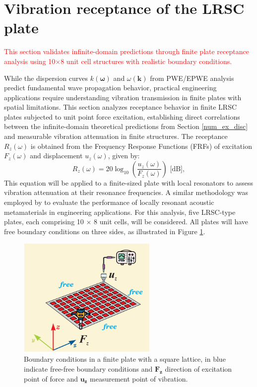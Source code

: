 \documentclass[review,numbers,sort&compress]{elsarticle}
\begin{document}
{%
\section{Vibration receptance of the LRSC plate}\label{simul_trans}
\textcolor{red}{This section validates infinite-domain predictions through finite plate receptance analysis using 10×8 unit cell structures with realistic boundary conditions.}

While the dispersion curves $k(\boldsymbol{\omega})$ and $\omega(\boldsymbol{k})$ from PWE/EPWE analysis predict fundamental wave propagation behavior, practical engineering applications require understanding vibration transmission in finite plates with spatial limitations. This section analyzes receptance behavior in finite LRSC plates subjected to unit point force excitation, establishing direct correlations between the infinite-domain theoretical predictions from Section \ref{num_ex_disc} and measurable vibration attenuation in finite structures. The receptance  $R_z(\omega)$  is obtained from the Frequency Response Functions (FRFs) of excitation $F_z(\omega)$ and displacement $u_z(\omega)$, given by:
\begin{equation}
	R_z(\omega) = 20 \log_{10} \left( \frac{u_z(\omega)}{F_z(\omega)} \right) \text{ [dB]},
	\label{receptance}
\end{equation}
This equation will be applied to a finite-sized plate with local resonators to assess vibration attenuation at their resonance frequencies. A similar methodology was employed by \cite{MIRANDA2019480} to evaluate the performance of locally resonant acoustic metamaterials in engineering applications. For this analysis, five LRSC-type plates, each comprising 10 × 8 unit cells, will be considered. All plates will have free boundary conditions on three sides, as illustrated in Figure \ref{bound_frf_modal}.

\begin{figure}[htb]
	\centering
	\includegraphics[width=0.6\textwidth]{ilustr_bound_force_frf_modal.pdf}
	\caption{Boundary conditions in a finite plate with a square lattice, in blue indicate free-free boundary conditions and $\mathbf{F_z}$ direction of excitation point of force and $\mathbf{u_z}$ measurement point of vibration.}
	\label{bound_frf_modal}
\end{figure}

}
\end{document}
